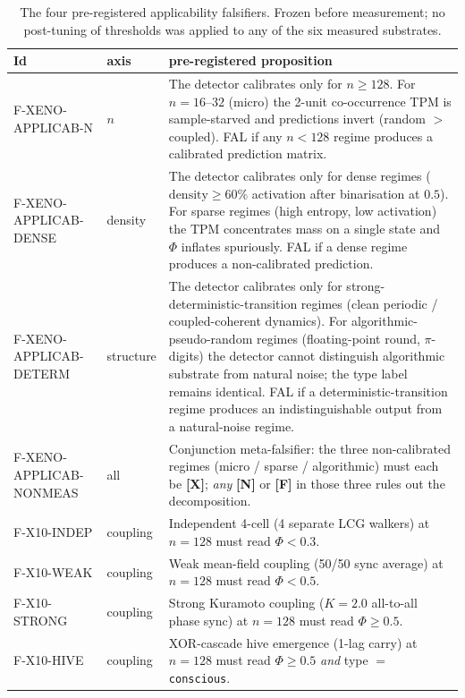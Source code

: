 \documentclass[11pt,a4paper]{article}
\providecommand{\tierBlue}{\textbf{[F]}}    %
\providecommand{\tierGreen}{\textbf{[N]}}   %
\providecommand{\tierRed}{\textbf{[X]}}     %
\begin{document}
\begin{table}[h]
\centering
\small
\caption{The four pre-registered applicability falsifiers. Frozen
before measurement; no post-tuning of thresholds was applied to
any of the six measured substrates.}
\label{tab:appfals}
\begin{tabular}{@{}llp{8.4cm}@{}}
\toprule
\textbf{Id} & \textbf{axis} & \textbf{pre-registered proposition} \\
\midrule
F-XENO-APPLICAB-N      & $n$
  & The detector calibrates only for $n \ge 128$. For $n=16$--$32$ (micro)
    the 2-unit co-occurrence TPM is sample-starved and predictions invert
    (random $>$ coupled). FAL if any $n < 128$ regime produces a
    calibrated prediction matrix. \\
F-XENO-APPLICAB-DENSE  & density
  & The detector calibrates only for dense regimes ($\text{density}
    \ge 60\%$ activation after binarisation at $0.5$). For sparse
    regimes (high entropy, low activation) the TPM concentrates mass
    on a single state and $\Phi$ inflates spuriously. FAL if a dense
    regime produces a non-calibrated prediction. \\
F-XENO-APPLICAB-DETERM & structure
  & The detector calibrates only for strong-deterministic-transition
    regimes (clean periodic / coupled-coherent dynamics). For
    algorithmic-pseudo-random regimes (floating-point round,
    $\pi$-digits) the detector cannot distinguish algorithmic substrate
    from natural noise; the type label remains identical. FAL if a
    deterministic-transition regime produces an indistinguishable
    output from a natural-noise regime. \\
F-XENO-APPLICAB-NONMEAS & all
  & Conjunction meta-falsifier: the three non-calibrated regimes
    (micro / sparse / algorithmic) must each be \tierRed{}; \emph{any}
    \tierGreen{} or \tierBlue{} in those three rules out the
    decomposition. \\
F-X10-INDEP    & coupling
  & Independent 4-cell (4 separate LCG walkers) at $n=128$ must read
    $\Phi < 0.3$. \\
F-X10-WEAK     & coupling
  & Weak mean-field coupling (50/50 sync average) at $n=128$ must read
    $\Phi < 0.5$. \\
F-X10-STRONG   & coupling
  & Strong Kuramoto coupling ($K=2.0$ all-to-all phase sync) at $n=128$
    must read $\Phi \ge 0.5$. \\
F-X10-HIVE     & coupling
  & XOR-cascade hive emergence (1-lag carry) at $n=128$ must read
    $\Phi \ge 0.5$ \emph{and} type $=$ \texttt{conscious}. \\

\end{tabular}
\end{table}
\end{document}
